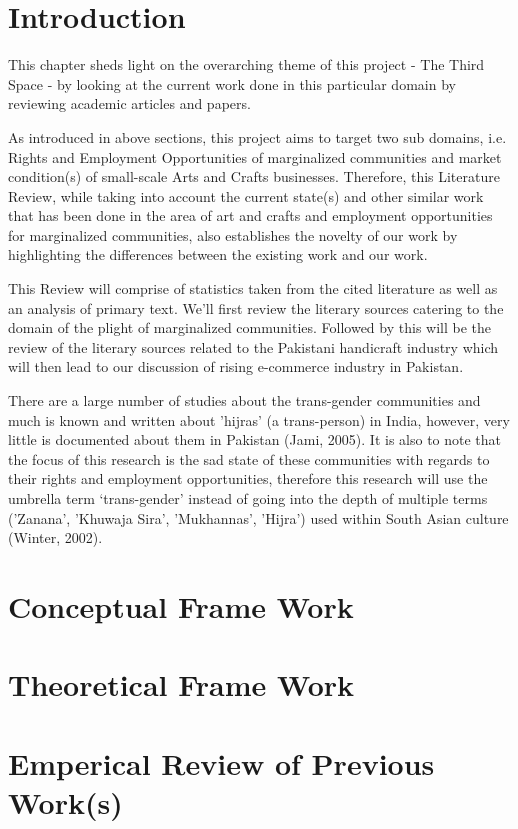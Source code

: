     
\section{Introduction}

This chapter sheds light on the overarching theme of this project - The Third Space - by looking at the current work done in this particular domain by reviewing academic articles and papers.

As introduced in above sections, this project aims to target two sub domains, i.e. Rights and Employment Opportunities of marginalized communities and market condition(s) of small-scale Arts and Crafts businesses. Therefore, this Literature Review, while taking into account the current state(s) and other similar work that has been done in the area of art and crafts and employment opportunities for marginalized communities, also establishes the novelty of our work by highlighting the differences between the existing work and our work.

This Review will comprise of statistics taken from the cited literature as well as an analysis of primary text. We'll first review the literary sources catering to the domain of the plight of marginalized communities. Followed by this will be the review of the literary sources related to the Pakistani handicraft industry which will then lead to our discussion of rising e-commerce industry in Pakistan.

There are a large number of studies about the trans-gender communities and much is known and written about 'hijras' (a trans-person) in India, however, very little is documented about them in Pakistan (Jami, 2005). It is also to note that the focus of this research is the sad state of these communities with regards to their rights and employment opportunities, therefore this research will use the umbrella term `trans-gender' instead of going into the depth of multiple terms ('Zanana', 'Khuwaja Sira', 'Mukhannas', 'Hijra') used within South Asian culture (Winter, 2002). 

\section{Conceptual Frame Work}

\section{Theoretical Frame Work}

\section{Emperical Review of Previous Work(s)}

